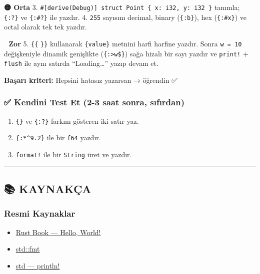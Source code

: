 \documentclass[12pt,a4paper]{article}
\begin{document}
\textbf{🟡 Orta}
3. \texttt{\#{[}derive(Debug){]}\ struct\ Point\ \{\ x:\ i32,\ y:\ i32\ \}} tanımla; \texttt{\{:?\}} ve \texttt{\{:\#?\}} ile yazdır.
4. \texttt{255} sayısını decimal, binary (\texttt{\{:b\}}), hex (\texttt{\{:\#x\}}) ve octal olarak tek tek yazdır.

\textbf{🔴 Zor}
5. \texttt{\{\{} \texttt{\}\}} kullanarak \texttt{\{value\}} metnini harfi harfine yazdır. Sonra \texttt{w\ =\ 10} değişkeniyle dinamik genişlikte (\texttt{\{:\textgreater{}w\$\}}) sağa hizalı bir sayı yazdır ve \texttt{print!} + \texttt{flush} ile aynı satırda ``Loading\ldots{}'' yazıp devam et.

\textbf{Başarı kriteri:} Hepsini hatasız yazarsan → öğrendin ✅

\subsubsection{✅ Kendini Test Et (2-3 saat sonra, sıfırdan)}\label{kendini-test-et-2-3-saat-sonra-sıfırdan-1}

\begin{enumerate}
\def\labelenumi{\arabic{enumi}.}
\tightlist
\item
  \texttt{\{\}} ve \texttt{\{:?\}} farkını gösteren iki satır yaz.
\item
  \texttt{\{:*\^{}9.2\}} ile bir \texttt{f64} yazdır.
\item
  \texttt{format!} ile bir \texttt{String} üret ve yazdır.
\end{enumerate}

\begin{center}\rule{0.5\linewidth}{0.5pt}\end{center}

\subsection{📚 KAYNAKÇA}\label{kaynakça-1}

\subsubsection{Resmi Kaynaklar}\label{resmi-kaynaklar-1}

\begin{itemize}
\tightlist
\item
  \href{https://doc.rust-lang.org/book/ch01-02-hello-world.html}{Rust Book --- Hello, World!}
\item
  \href{https://doc.rust-lang.org/std/fmt/index.html}{std::fmt}
\item
  \href{https://doc.rust-lang.org/std/macro.println.html}{std --- println!}
\end{itemize}
\end{document}
